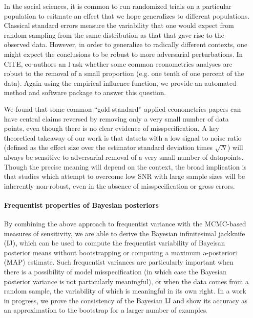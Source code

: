 In the social sciences, it is common to run randomized trials on a particular
population to esitmate an effect that we hope generalizes to different
populations.  Classical standard errors measure the variability that one
would expect from random sampling from the same distribution as that that
gave rise to the observed data.  However, in order to generalize to radically
different contexts, one might expect the conclusions to be robust to more
adversarial perturbations.  In CITE, co-authors an I ask whether some
common econometrics analyses are robust to the removal of a small proportion
(e.g. one tenth of one percent of the data).  Again using the empirical
influence function, we provide an automated method and software package
to answer this question.

We found that some common ``gold-standard'' applied econometrics papers
can have central claims reversed by removing only a very small number of
data points, even though there is no clear evidence of misspecification.
A key theoretical takeaway of our work is that datsets with a low signal
to noise ratio (defined as the effect size over the estimator standard
deviation times $\sqrt{N}$) will always be sensitive to adversarial removal
of a very small number of datapoints.  Though the precise meaning will
depend on the context, the broad implication is that studies which
attempt to overcome low SNR with large sample sizes will be inherently
non-robust, even in the absence of misspecification or gross errors.



\paragraph{Frequentist properties of Bayesian posteriors}

By combining the above approach to frequentist variance with the MCMC-based
measures of sensitivity, we are able to derive the Bayesian infinitesimal
jackknife (IJ), which can be used to compute the frequentist variability
of Bayeisan posterior means without bootstrapping or computing a maximum
a-posteriori (MAP) estimate.  Such frequentist variances are particularly
important when there is a possibility of model misspecification (in which
case the Bayesian posterior variance is not particularly meaningful),
or when the data comes from a random sample, the variability of which
is meaningful in its own right.  In a work in progress, we prove the consistency
of the Bayesian IJ and show its accuracy as an approximation to the bootstrap
for a larger number of examples.
\citet{huggins:2019:bayesbag}
\citet{waddell:2002:bayesphyloboot}
\citet{kleijn:2006:misspecification}
\citet{kass:1990:posteriorexpansions} %
\citet[Chapter 6]{lehman:1983:pointestimation}


